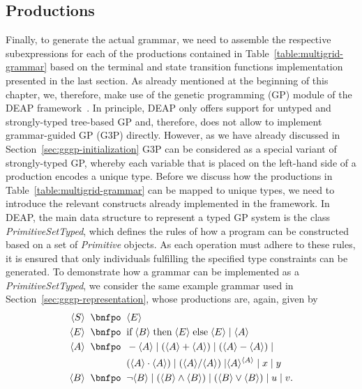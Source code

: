\subsection{Productions}
Finally, to generate the actual grammar, we need to assemble the respective subexpressions for each of the productions contained in Table~\ref{table:multigrid-grammar} based on the terminal and state transition functions implementation presented in the last section.
As already mentioned at the beginning of this chapter, we, therefore, make use of the genetic programming (GP) module of the DEAP framework~\cite{rainville2012deap}. 
In principle, DEAP only offers support for untyped and strongly-typed tree-based GP and, therefore, does not allow to implement grammar-guided GP (G3P) directly.
However, as we have already discussed in Section~\ref{sec:gggp-initialization} G3P can be considered as a special variant of strongly-typed GP, whereby each variable that is placed on the left-hand side of a production encodes a unique type.
Before we discuss how the productions in Table~\ref{table:multigrid-grammar} can be mapped to unique types, we need to introduce the relevant constructs already implemented in the framework.
In DEAP, the main data structure to represent a typed GP system is the class \emph{PrimitiveSetTyped}, which defines the rules of how a program can be constructed based on a set of \emph{Primitive} objects.
As each operation must adhere to these rules, it is ensured that only individuals fulfilling the specified type constraints can be generated.
To demonstrate how a grammar can be implemented as a \emph{PrimitiveSetTyped}, we consider the same example grammar used in Section~\ref{sec:gggp-representation}, whose productions are, again, given by
\begin{equation*}
	\begin{split}
		\ps S \; \; \bnfpo & \; \; \ps E \\
		\ps E \; \; \bnfpo & \; \; \text{if} \; \ps B \; \text{then} \; \ps E \; \text{else} \; \ps E \; | \; \ps A \\
		\ps A \; \; \bnfpo & \; \; -\ps A \; | \; (\ps A + \ps A) \; | \; (\ps A - \ps A) \; | \\
		& \; \; (\ps A \cdot \ps A) \; | \; (\ps A / \ps A) \; | \ps{A}^{\ps{A}} \; | \; x \; | \; y \\  
		\ps B \; \; \bnfpo & \; \;  \neg \ps B \; | \; (\ps B \wedge \ps B) \; | \; (\ps B \vee \ps B) \; | \; u \; | \; v.
	\end{split}
\end{equation*}
